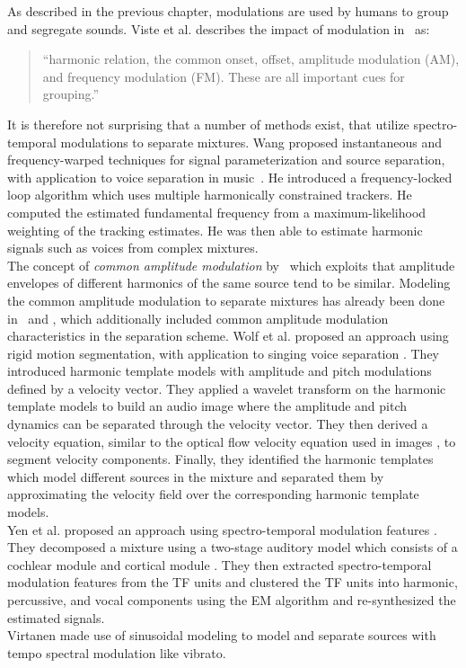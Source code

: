 As described in the previous chapter, modulations are used by humans to group and segregate sounds. Viste et al. describes the impact of modulation in~\cite{viste03} as:

\begin{quote}
``harmonic relation, the common onset, offset, amplitude modulation (AM), and frequency modulation (FM). These are all important cues for grouping.''
\end{quote}

It is therefore not surprising that a number of methods exist, that utilize spectro-temporal modulations to separate mixtures.
Wang proposed instantaneous and frequency-warped techniques for signal parameterization and source separation, with application to voice separation in music~\cite{wang94,wang95}.
He introduced a frequency-locked loop algorithm which uses multiple harmonically constrained trackers.
He computed the estimated fundamental frequency from a maximum-likelihood weighting of the tracking estimates. He was then able to estimate harmonic signals such as voices from complex mixtures.\\
The concept of \emph{common amplitude modulation} by~\cite{bregman90, wang06} which exploits that amplitude envelopes of different harmonics of the same source tend to be similar.
Modeling the common amplitude modulation to separate mixtures has already been done in~\cite{li07, li09} and \cite{cano14}, which additionally included common amplitude modulation characteristics in the separation scheme.
Wolf et al. proposed an approach using rigid motion segmentation, with application to singing voice separation \cite{wolf14, wolf16}. They introduced harmonic template models with amplitude and pitch modulations defined by a velocity vector. They applied a wavelet transform \cite{anden14} on the harmonic template models to build an audio image where the amplitude and pitch dynamics can be separated through the velocity vector. They then derived a velocity equation, similar to the optical flow velocity equation used in images \cite{bernard01}, to segment velocity components. Finally, they identified the harmonic templates which model different sources in the mixture and separated them by approximating the velocity field over the corresponding harmonic template models.\\
Yen et al. proposed an approach using spectro-temporal modulation features \cite{yen14,yen15}. They decomposed a mixture using a two-stage auditory model which consists of a cochlear module \cite{chi05} and cortical module \cite{chi99}. They then extracted spectro-temporal modulation features from the TF units and clustered the TF units into harmonic, percussive, and vocal components using the EM algorithm and re-synthesized the estimated signals.\\
Virtanen made use of sinusoidal modeling \cite{virtanen00} to model and separate sources with tempo spectral modulation like vibrato.

